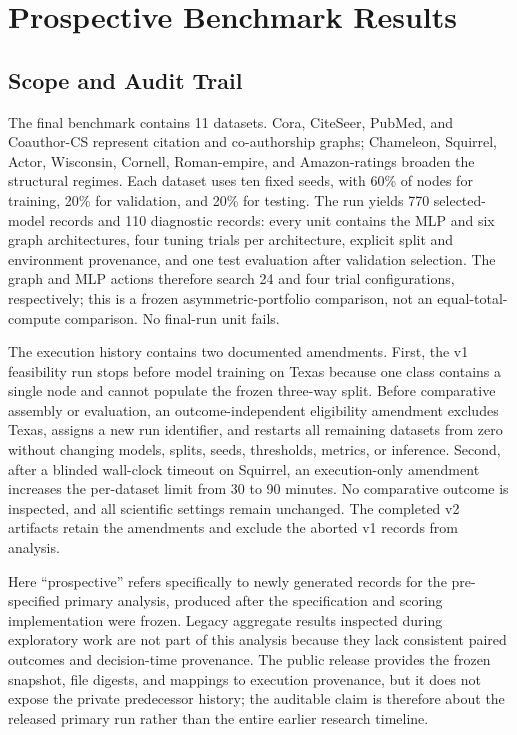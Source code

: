 \section{Prospective Benchmark Results}
\label{sec:prospective}

\subsection{Scope and Audit Trail}

The final benchmark contains 11 datasets. Cora, CiteSeer, PubMed, and Coauthor-CS represent citation and co-authorship graphs; Chameleon, Squirrel, Actor, Wisconsin, Cornell, Roman-empire, and Amazon-ratings broaden the structural regimes. Each dataset uses ten fixed seeds, with 60\% of nodes for training, 20\% for validation, and 20\% for testing. The run yields 770 selected-model records and 110 diagnostic records: every unit contains the MLP and six graph architectures, four tuning trials per architecture, explicit split and environment provenance, and one test evaluation after validation selection. The graph and MLP actions therefore search 24 and four trial configurations, respectively; this is a frozen asymmetric-portfolio comparison, not an equal-total-compute comparison. No final-run unit fails.

The execution history contains two documented amendments. First, the v1 feasibility run stops before model training on Texas because one class contains a single node and cannot populate the frozen three-way split. Before comparative assembly or evaluation, an outcome-independent eligibility amendment excludes Texas, assigns a new run identifier, and restarts all remaining datasets from zero without changing models, splits, seeds, thresholds, metrics, or inference. Second, after a blinded wall-clock timeout on Squirrel, an execution-only amendment increases the per-dataset limit from 30 to 90 minutes. No comparative outcome is inspected, and all scientific settings remain unchanged. The completed v2 artifacts retain the amendments and exclude the aborted v1 records from analysis.

Here ``prospective'' refers specifically to newly generated records for the pre-specified primary analysis, produced after the specification and scoring implementation were frozen. Legacy aggregate results inspected during exploratory work are not part of this analysis because they lack consistent paired outcomes and decision-time provenance. The public release provides the frozen snapshot, file digests, and mappings to execution provenance, but it does not expose the private predecessor history; the auditable claim is therefore about the released primary run rather than the entire earlier research timeline.

